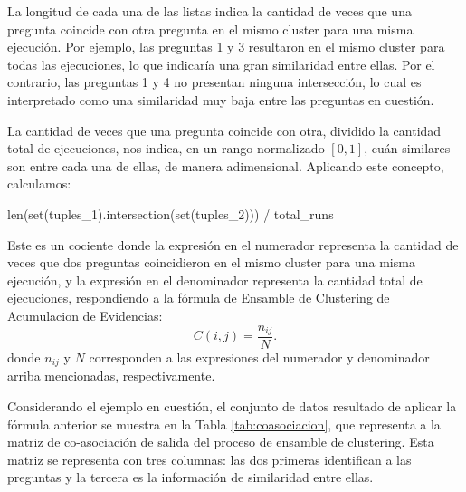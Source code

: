 La longitud de cada una de las listas indica la cantidad de veces que una pregunta coincide con otra pregunta en el mismo cluster para una misma ejecución. Por ejemplo, las preguntas 1 y 3 resultaron en el mismo cluster para todas las ejecuciones, lo que indicaría una gran similaridad entre ellas. Por el contrario, las preguntas 1 y 4 no presentan ninguna intersección, lo cual es interpretado como una similaridad muy baja entre las preguntas en cuestión.

\bigskip La cantidad de veces que una pregunta coincide con otra, dividido la cantidad total de ejecuciones, nos indica, en un rango normalizado \([0,1]\), cuán similares son entre cada una de ellas, de manera adimensional. Aplicando este concepto, calculamos:

\begin{python}
len(set(tuples_1).intersection(set(tuples_2))) / total_runs
\end{python}
Este es un cociente donde la expresión  en el numerador representa la cantidad de veces que dos preguntas coincidieron en el mismo cluster para una misma ejecución, y la expresión  en el denominador representa la cantidad total de ejecuciones, respondiendo a la fórmula de Ensamble de Clustering de Acumulacion de Evidencias:
\[C(i,j)=\frac{n_{ij}}{N}.\]
donde \(n_{ij}\) y \(N\) corresponden a las expresiones del numerador y denominador arriba mencionadas, respectivamente.

\bigskip Considerando el ejemplo en cuestión, el conjunto de datos resultado de aplicar la fórmula anterior se muestra en la Tabla \ref{tab:coasociacion}, que representa a la matriz de co-asociación de salida del proceso de ensamble de clustering. Esta matriz se representa con tres columnas: las dos primeras identifican a las preguntas y la tercera es la información de similaridad entre ellas.

